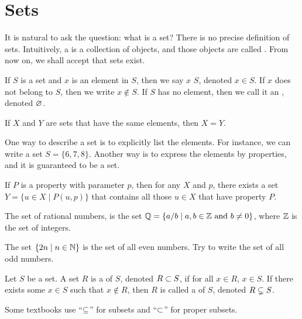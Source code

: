 \documentclass[10pt]{article}
\begin{document}
\section{Sets}
It is natural to ask the question: what is a set? There is no precise definition of sets. Intuitively, a  is a collection of objects, and those objects are called . From now on, we shall accept that sets exist.
\par
If $S$ is a set and $x$ is an element in $S$, then we say $x$  $S$, denoted $x\in S$. If $x$ does not belong to $S$, then we write $x\notin S$. If $S$ has no element, then we call it an , denoted $\varnothing$.
\begin{Axiom of Extensionality}
    If $X$ and $Y$ are sets that have the same elements, then $X=Y$.
\end{Axiom of Extensionality}
\par
One way to describe a set is to explicitly list the elements. For instance, we can write a set $S=\{6,7,8\}$. Another way is to express the elements by properties, and it is guaranteed to be a set. 
\begin{Axiom Schema of Separation}
    If $P$ is a property with parameter $p$, then for any $X$ and $p$, there exists a set $Y=\{u\in X\mid P(u,p)\}$ that contains all those $u\in X$ that have property $P$.
\end{Axiom Schema of Separation}
\begin{example}
    The set of rational numbers, is the set $\mathbb{Q}=\{a/b\mid a,b\in\mathbb{Z}\ \text{and}\ b\ne 0\}$, where $\mathbb{Z}$ is the set of integers.
\end{example}
\begin{example}
    The set $\{2n\mid n\in\mathbb{N}\}$ is the set of all even numbers. Try to write the set of all odd numbers.
\end{example}
\begin{definition}
    Let $S$ be a set. A set $R$ is a  of $S$, denoted $R\subset S$, if for all $x\in R$, $x\in S$. If there exists some $x\in S$ such that $x\notin R$, then $R$ is called a  of $S$, denoted $R\subsetneq S$.
\end{definition}
\begin{remark}
    Some textbooks use ``$\subseteq$'' for subsets and ``$\subset$'' for proper subsets.
\end{remark}
\end{document}
